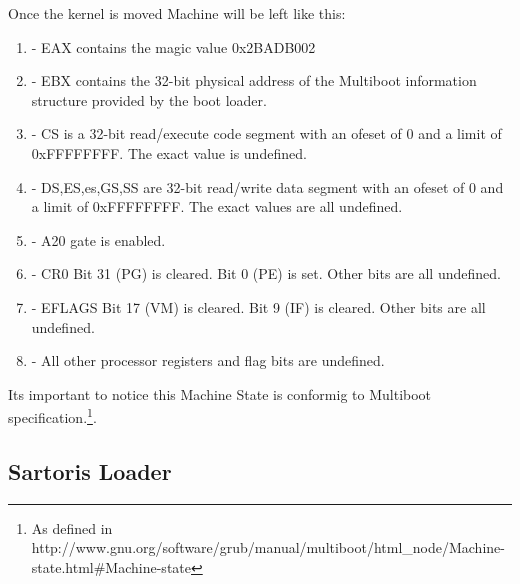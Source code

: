 \documentclass[11pt, letterpaper, twoside, english]{book}
\begin{document}
Once the kernel is moved Machine will be left like this:\\
\begin{enumerate}
\item[] - EAX contains the magic value 0x2BADB002
\item[] - EBX contains the 32-bit physical address of the Multiboot information structure provided by the boot loader.
\item[] - CS is a 32-bit read/execute code segment with an ofeset of 0 and a limit of 0xFFFFFFFF. The exact value is undefined.
\item[] - DS,ES,es,GS,SS are 32-bit read/write data segment with an ofeset of 0 and a limit of 0xFFFFFFFF. The exact values are all undefined.
\item[] - A20 gate is enabled.
\item[] - CR0 Bit 31 (PG) is cleared. Bit 0 (PE) is set. Other bits are all undefined.
\item[] - EFLAGS Bit 17 (VM) is cleared. Bit 9 (IF) is cleared. Other bits are all undefined.
\item[] - All other processor registers and flag bits are undefined.
\end{enumerate}

Its important to notice this Machine State is conformig to Multiboot specification.\footnote{As defined in http://www.gnu.org/software/grub/manual/multiboot/html\_node/Machine-state.html\#Machine-state}. 

\subsection{Sartoris Loader}
\end{document}

